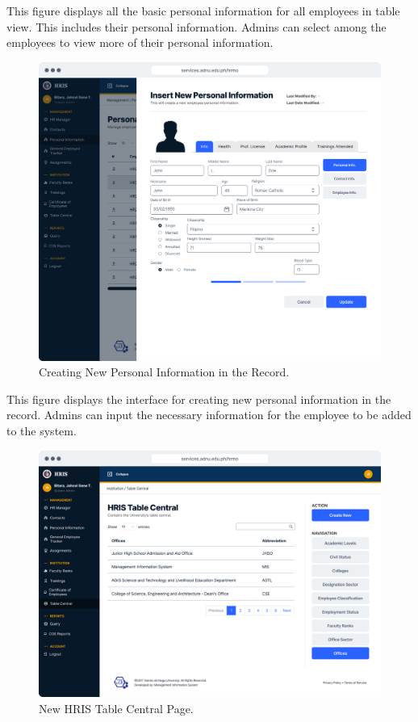     This figure displays all the basic personal information for all employees in table view. This includes their personal information. Admins can select among the employees to view more of their personal information.

    \begin{figure}[H]
        \centering
        \includegraphics[width=1\linewidth]{figures/app/pi-insert.png}
        \caption{Creating New Personal Information in the Record.}
        \label{fig:app-pi-insert}
    \end{figure}

    This figure displays the interface for creating new personal information in the record. Admins can input the necessary information for the employee to be added to the system.

    \begin{figure}[H]
        \centering
        \includegraphics[width=1\linewidth]{figures/app/table-central.png}
        \caption{New HRIS Table Central Page.}
        \label{fig:app-table-central}
    \end{figure}

